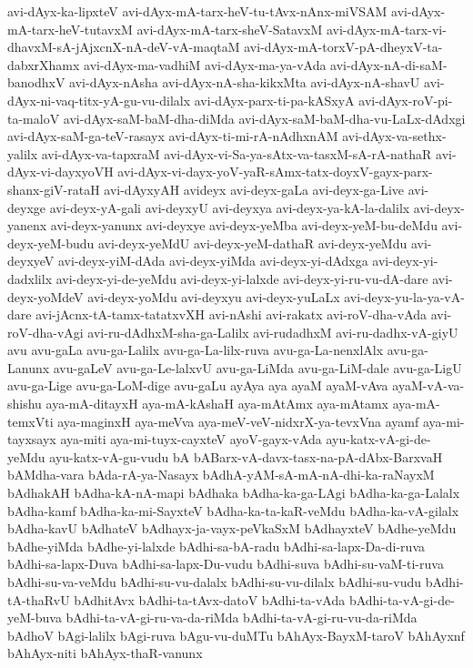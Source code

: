 {avi-dAyx-ka-lipxteV
avi-dAyx-mA-tarx-heV-tu-tAvx-nAnx-miVSAM
avi-dAyx-mA-tarx-heV-tutavxM
avi-dAyx-mA-tarx-sheV-SatavxM
avi-dAyx-mA-tarx-vi-dhavxM-sA-jAjxcnX-nA-deV-vA-maqtaM
avi-dAyx-mA-torxV-pA-dheyxV-ta-dabxrXhamx
avi-dAyx-ma-vadhiM
avi-dAyx-ma-ya-vAda
avi-dAyx-nA-di-saM-banodhxV
avi-dAyx-nAsha
avi-dAyx-nA-sha-kikxMta
avi-dAyx-nA-shavU
avi-dAyx-ni-vaq-titx-yA-gu-vu-dilalx
avi-dAyx-parx-ti-pa-kASxyA
avi-dAyx-roV-pi-ta-maloV
avi-dAyx-saM-baM-dha-diMda
avi-dAyx-saM-baM-dha-vu-LaLx-dAdxgi
avi-dAyx-saM-ga-teV-rasayx
avi-dAyx-ti-mi-rA-nAdhxnAM
avi-dAyx-va-sethx-yalilx
avi-dAyx-va-tapxraM
avi-dAyx-vi-Sa-ya-sAtx-va-tasxM-sA-rA-nathaR
avi-dAyx-vi-dayxyoVH
avi-dAyx-vi-dayx-yoV-yaR-sAmx-tatx-doyxV-gayx-parx-shanx-giV-rataH
avi-dAyxyAH
avideyx
avi-deyx-gaLa
avi-deyx-ga-Live
avi-deyxge
avi-deyx-yA-gali
avi-deyxyU
avi-deyxya
avi-deyx-ya-kA-la-dalilx
avi-deyx-yanenx
avi-deyx-yanunx
avi-deyxye
avi-deyx-yeMba
avi-deyx-yeM-bu-deMdu
avi-deyx-yeM-budu
avi-deyx-yeMdU
avi-deyx-yeM-dathaR
avi-deyx-yeMdu
avi-deyxyeV
avi-deyx-yiM-dAda
avi-deyx-yiMda
avi-deyx-yi-dAdxga
avi-deyx-yi-dadxlilx
avi-deyx-yi-de-yeMdu
avi-deyx-yi-lalxde
avi-deyx-yi-ru-vu-dA-dare
avi-deyx-yoMdeV
avi-deyx-yoMdu
avi-deyxyu
avi-deyx-yuLaLx
avi-deyx-yu-la-ya-vA-dare
avi-jAcnx-tA-tamx-tatatxvXH
avi-nAshi
avi-rakatx
avi-roV-dha-vAda
avi-roV-dha-vAgi
avi-ru-dAdhxM-sha-ga-Lalilx
avi-rudadhxM
avi-ru-dadhx-vA-giyU
avu
avu-gaLa
avu-ga-Lalilx
avu-ga-La-lilx-ruva
avu-ga-La-nenxlAlx
avu-ga-Lanunx
avu-gaLeV
avu-ga-Le-lalxvU
avu-ga-LiMda
avu-ga-LiM-dale
avu-ga-LigU
avu-ga-Lige
avu-ga-LoM-dige
avu-gaLu
ayAya
aya
ayaM
ayaM-vAva
ayaM-vA-va-shishu
aya-mA-ditayxH
aya-mA-kAshaH
aya-mAtAmx
aya-mAtamx
aya-mA-temxVti
aya-maginxH
aya-meVva
aya-meV-veV-nidxrX-ya-tevxVna
ayamf
aya-mi-tayxsayx
aya-miti
aya-mi-tuyx-cayxteV
ayoV-gayx-vAda
ayu-katx-vA-gi-de-yeMdu
ayu-katx-vA-gu-vudu
bA
bABarx-vA-davx-tasx-na-pA-dAbx-BarxvaH
bAMdha-vara
bAda-rA-ya-Nasayx
bAdhA-yAM-sA-mA-nA-dhi-ka-raNayxM
bAdhakAH
bAdha-kA-nA-mapi
bAdhaka
bAdha-ka-ga-LAgi
bAdha-ka-ga-Lalalx
bAdha-kamf
bAdha-ka-mi-SayxteV
bAdha-ka-ta-kaR-veMdu
bAdha-ka-vA-gilalx
bAdha-kavU
bAdhateV
bAdhayx-ja-vayx-peVkaSxM
bAdhayxteV
bAdhe-yeMdu
bAdhe-yiMda
bAdhe-yi-lalxde
bAdhi-sa-bA-radu
bAdhi-sa-lapx-Da-di-ruva
bAdhi-sa-lapx-Duva
bAdhi-sa-lapx-Du-vudu
bAdhi-suva
bAdhi-su-vaM-ti-ruva
bAdhi-su-va-veMdu
bAdhi-su-vu-dalalx
bAdhi-su-vu-dilalx
bAdhi-su-vudu
bAdhi-tA-thaRvU
bAdhitAvx
bAdhi-ta-tAvx-datoV
bAdhi-ta-vAda
bAdhi-ta-vA-gi-de-yeM-buva
bAdhi-ta-vA-gi-ru-va-da-riMda
bAdhi-ta-vA-gi-ru-vu-da-riMda
bAdhoV
bAgi-lalilx
bAgi-ruva
bAgu-vu-duMTu
bAhAyx-BayxM-taroV
bAhAyxnf
bAhAyx-niti
bAhAyx-thaR-vanunx
}
